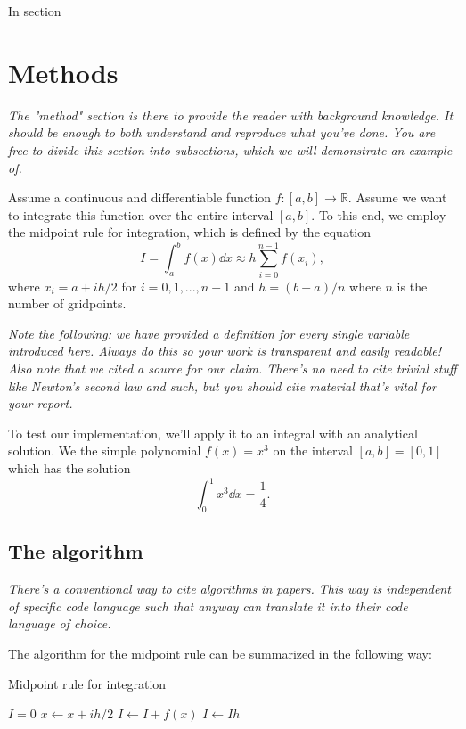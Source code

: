 \documentclass[english,notitlepage, reprint]{revtex4-1}  %
\begin{document}
In section 

\section{Methods}
\textit{The "method" section is there to provide the reader with background knowledge. It should be enough to both understand and reproduce what you've done. You are free to divide this section into subsections, which we will demonstrate an example of.}

Assume a continuous and differentiable function $f : [a,b] \to \mathbb{R}$. Assume we want to integrate this function over the entire interval $[a,b]$. To this end, we employ the midpoint rule for integration, which is defined by the equation \cite{midpoint_rule}
\begin{equation}
	I = \int_a^b f(x)\dd x \approx h\sum_{i=0}^{n-1} f(x_i), 
\end{equation}
where $x_i = a + ih/2$ for $i = 0, 1, ..., n-1$ and $h = (b-a)/n$ where $n$ is the number of gridpoints.

\textit{Note the following: we have provided a definition for every single variable introduced here. Always do this so your work is transparent and easily readable! Also note that we cited a source for our claim. There's no need to cite trivial stuff like Newton's second law and such, but you should cite material that's vital for your report.}

To test our implementation, we'll apply it to an integral with an analytical solution. We the simple polynomial $f(x) = x^3$ on the interval $[a,b] = [0,1]$ which has the solution 
\begin{equation}
	\int_0^1 x^3 \dd x = \frac{1}{4}.
\end{equation}

\subsection*{The algorithm}
\textit{There's a conventional way to cite algorithms in papers. This way is independent of specific code language such that anyway can translate it into their code language of choice.}

The algorithm for the midpoint rule can be summarized in the following way:

\begin{algorithm}[H]
	\caption{Midpoint rule for integration}\label{algo:midpoint_rule}
	\begin{algorithmic}
		\State $I = 0$ 
		\State $x \leftarrow x + ih/2$   %
		\State $I \leftarrow I + f(x)$  %
		\EndFor
		\State $I \leftarrow Ih$ 
	\end{algorithmic}
\end{algorithm}
\end{document}

